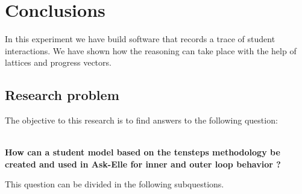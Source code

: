 \chapter{Conclusions}

In this experiment we have build software that records a trace of student interactions.
We have shown how the reasoning can take place with the help of lattices and progress vectors.

\section{Research problem}\label{sec:questions}

The objective to this research is to find answers to the following question:

\begin{center}
\textbf{\\How can a student model based on the \gls{tensteps} methodology be created and used in Ask-Elle for inner and outer loop behavior ?}
\end{center}

This question can be divided in the following subquestions.

